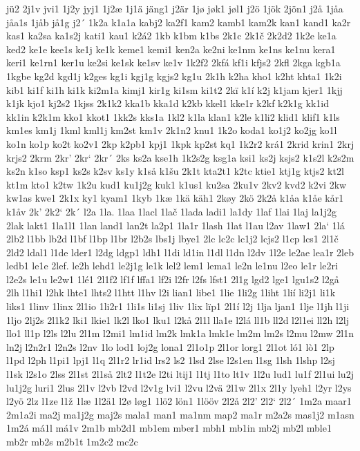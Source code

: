 jü2
2j1v
jvi1
1j2y
jyj1
1j2æ
1j1ä
jäng1
j2är
1jø
jøk1
jøl1
j2ö
1jök
2jön1
j2å
1jåa
jåa1s
1jåb
jå1g
j2´
1k2a
k1a1a
kabj2
ka2f1
kam2
kamb1
kam2k
kan1
kand1
ka2r
kas1
ka2sa
ka1s2j
kati1
kau1
k2á2
1kb
k1bm
k1bs
2k1c
2k1č
2k2d2
1k2e
ke1a
ked2
ke1e
kee1s
ke1j
ke1k
keme1
kemi1
ken2a
ke2ni
ke1nm
ke1ns
ke1nu
kera1
keri1
ke1rn1
ker1u
ke2si
ke1sk
ke1sv
ke1v
1k2f2
2kfá
kf1i
kfjs2
2kfl
2kga
kgb1a
1kgbe
kg2d
kgd1j
k2ges
kg1i
kgj1g
kgjs2
kg1u
2k1h
k2ha
kho1
k2ht
khta1
1k2i
kib1
ki1f
ki1h
ki1k
ki2m1a
kimj1
kir1g
ki1sm
ki1t2
2kï
k1í
k2j
k1jam
kjer1
1kjj
k1jk
kjo1
kj2s2
1kjss
2k1k2
kka1b
kka1d
k2kb
kkel1
kke1r
k2kf
k2k1g
kk1id
kk1in
k2k1m
kko1
kkot1
1kk2s
kks1a
1kl2
k1la
klan1
k2le
k1li2
klid1
klif1
k1ls
km1es
km1j
1kml
kml1j
km2st
km1v
2k1n2
knu1
1k2o
koda1
ko1j2
ko2jg
ko1l
ko1n
ko1p
ko2t
ko2v1
2kp
k2pb1
kpj1
1kpk
kp2st
kq1
1k2r2
krá1
2krid
krin1
2krj
krjs2
2krm
2kr'
2kr`
2kr´
2ks
ks2a
kse1h
1k2s2g
ksg1a
ksi1
ks2j
ksjs2
k1s2l
k2s2m
ks2n
k1so
ksp1
ks2s
k2sv
ks1y
k1så
k1šu
2k1t
kta2t1
k2tc
ktie1
ktj1g
ktjs2
kt2l
kt1m
kto1
k2tw
1k2u
kud1
ku1j2g
kuk1
k1us1
ku2sa
2ku1v
2kv2
kvd2
k2vi
2kw
kw1as
kwe1
2k1x
ky1
kyam1
1kyb
1kæ
1kä
käh1
2køy
2kö
2k2å
k1åa
k1åe
kår1
k1åv
2k'
2k2`
2k´
l2a
1la.
1laa
1lacl
1lač
1lada
ladi1
la1dy
1laf
1lai
1laj
la1j2g
2lak
lakt1
1la1l1
1lan
land1
lan2t
la2p1
1la1r
1lash
1lat
l1au
l2av
1law1
2la`
1lá
2lb2
l1bb
lb2d
l1bf
l1bp
l1br
l2b2s
lbs1j
lbye1
2lc
lc2c
lc1j2
lcjs2
l1cp
lcs1
2l1č
2ld2
ldal1
l1de
lder1
l2dg
ldgp1
ldh1
l1di
ld1in
l1dl
l1dn
l2dv
1l2e
le2ae
lea1r
2leb
ledb1
le1e
2lef.
le2h
lehd1
le2j1g
le1k
lel2
lem1
lema1
le2n
le1nu
l2eo
le1r
le2ri
l2e2s
le1u
le2w1
1lé1
2l1f2
lf1f
lffa1
lf2i
l2fr
l2fs
lfst1
2l1g
lgd2
lge1
lgu1s2
l2gå
2lh
l1hi1
l2hk
lhte1
lhts2
l1htt
l1hv
l2i
lian1
libe1
1lie
1li2g
1liht
1lií
li2j1
li1k
liks1
1linv
1linx
2l1io
1li2r1
1li1s
li1sj
1liv
1lix
lïp1
2l1í
l2j
1lja
ljan1
1lje
l1jh
l1ji
1ljo
2lj2s
2l1k2
lki1
lkie1
lk2l
lko1
lku1
l2kå
2l1l
lla1e
l2lá
ll1b
ll2d
l2l1ei
ll2h
l2lj
llo1
ll1p
l2ls
l2lu
2l1m
l2mi1
lm1id
lm2k
lmk1a
lmk1e
lm2m
lm2s
l2mu
l2mw
2l1n
ln2j
l2n2r1
l2n2s
l2nv
1lo
lod1
loj2g
lona1
2l1o1p
2l1or
lorg1
2l1ot
ló1
lò1
2lp
l1pd
l2ph
l1pi1
lpj1
l1q
2l1r2
lr1id
lrs2
ls2
1lsd
2lse
l2s1en
l1sg
1lsh
1lshp
l2sj
l1sk
l2s1o
2lss
2l1st
2l1så
2lt2
l1t2e
l2ti
ltij1
l1tj
l1to
lt1v
1l2u
lud1
lu1f
2l1ui
lu2j
lu1j2g
luri1
2lus
2l1v
l2vb
l2vd
l2v1g
lvi1
l2vu
l2vä
2l1w
2l1x
2l1y
lyeh1
l2yr
l2ys
l2yö
2lz
l1ze
l1ž
1læ
1l2ä1
l2ø
løg1
1lö2
lön1
1lööv
2l2å
2l2'
2l2`
2l2´
1m2a
maar1
2m1a2i
ma2j
ma1j2g
maj2s
mala1
man1
ma1nm
map2
ma1r
m2a2s
mas1j2
m1asn
1m2á
má1l
má1v
2m1b
mb2d1
mb1em
mber1
mbh1
mb1in
mb2j
mb2l
mble1
mb2r
mb2s
m2b1t
1m2c2
mc2c
